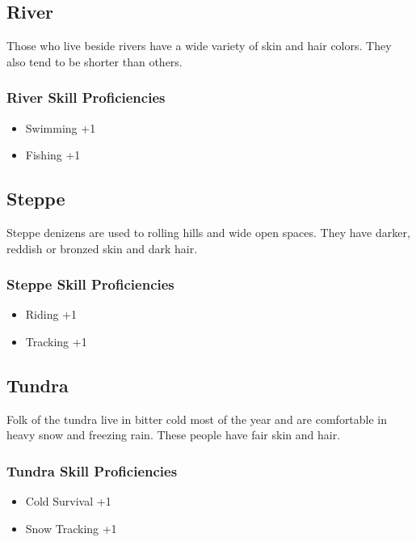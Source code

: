 \begin{multicols}{2}
\subsection{River}

Those who live beside rivers have a wide variety of skin and hair colors.
They also tend to be shorter than others.

\subsubsection{River Skill Proficiencies}

\begin{itemize}
    \item Swimming +1
    \item Fishing +1
\end{itemize}

\subsection{Steppe}

Steppe denizens are used to rolling hills and wide open spaces. They have
darker, reddish or bronzed skin and dark hair.

\subsubsection{Steppe Skill Proficiencies}

\begin{itemize}
    \item Riding +1
    \item Tracking +1
\end{itemize}

\subsection{Tundra}

Folk of the tundra live in bitter cold most of the year and are comfortable
in heavy snow and freezing rain. These people have fair skin and hair.

\subsubsection{Tundra Skill Proficiencies}

\begin{itemize}
    \item Cold Survival +1
    \item Snow Tracking +1
\end{itemize}

\end{multicols}
